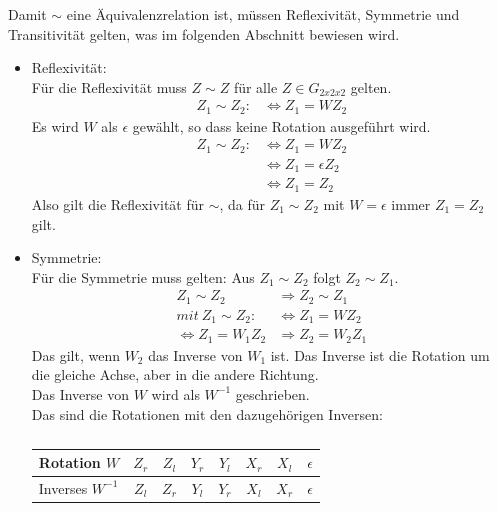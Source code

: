 \documentclass[12pt,a4paper, usenames, dvipsnames]{article}
\begin{document}
Damit $\sim$ eine Äquivalenzrelation ist, müssen Reflexivität, Symmetrie und Transitivität gelten, was im folgenden Abschnitt bewiesen wird.



\begin{itemize}

\item Reflexivität:\\
Für die Reflexivität muss $Z \sim Z$ für alle $Z \in G_{2x2x2}$ gelten. 
\begin{align*}
Z_1 \sim Z_2 : & \Leftrightarrow  Z_1 = WZ_2
\end{align*}
Es wird $W$ als $\epsilon$ gewählt, so dass keine Rotation ausgeführt wird.
\begin{align*}
Z_1 \sim Z_2 : & \Leftrightarrow  Z_1 = WZ_2 \\
\ & \Leftrightarrow Z_1=\epsilon Z_2 \\
\ & \Leftrightarrow Z_1 = Z_2
\end{align*}
Also gilt die Reflexivität für $\sim$, da für $Z_1 \sim Z_2$ mit $W=\epsilon$ immer $Z_1 = Z_2$ gilt.

\item Symmetrie: \\
Für die Symmetrie muss gelten: Aus $Z_1 \sim Z_2$ folgt $Z_2 \sim Z_1$.
\begin{align*}
Z_1 \sim Z_2 & \Rightarrow Z_2 \sim Z_1 \\
mit \ Z_1 \sim Z_2 : & \Leftrightarrow  Z_1 = WZ_2 \\
\Leftrightarrow Z_1 = W_1 Z_2 & \Rightarrow Z_2 = W_2 Z_1
\end{align*}
Das gilt, wenn $W_2$ das Inverse von $W_1$ ist. Das Inverse ist die Rotation um die gleiche Achse, aber in die andere Richtung. \\
Das Inverse von $W$ wird als $W^{-1}$ geschrieben. \\

Das sind die Rotationen mit den dazugehörigen Inversen: \\

\begin{table}[H]
\centering
\begin{tabular}{|l||c|c|c|c|c|c|c|}
\hline
Rotation $W$ & ${Z_r}$ & ${Z_l}$ &  ${Y_r}$ & ${Y_l}$ & ${X_r}$ & ${X_l}$ & $\epsilon$ \\
\hline
Inverses $W^{-1}$ & ${Z_l}$ & ${Z_r}$ &  ${Y_l}$ & ${Y_r}$ & ${X_l}$ & ${X_r}$ & $\epsilon$ \\
\hline
\end{tabular} 
\caption[Inverse der Rotationen]{}
\end{table}


\end{itemize}
\end{document}
